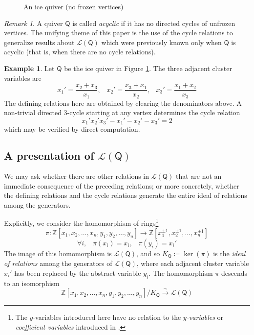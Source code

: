 \documentclass[10pt]{amsart}
\numberwithin{equation}{section}
\theoremstyle{definition}
\newtheorem{ex}[thm]{Example}
\theoremstyle{remark}
\newtheorem{rem}[thm]{Remark}
\renewcommand{\L}{\mathcal{L}}%
\newcommand{\1}{^{-1}}
\def\ZZ{\mathbb{Z}}
\newcommand{\garrow}[1]{\stackrel{#1}{\longrightarrow}}
\def\Q{\mathsf{Q}}
\begin{document}
\begin{figure}[h!t]
\caption{An ice quiver (no frozen vertices)}
\label{fig: 3cycle}
\end{figure}

\begin{rem}
A quiver $\Q$ is called \textit{acyclic} if it has no directed cycles of unfrozen vertices.  The unifying theme of this paper is the use of the cycle relations to generalize results about $\L(\Q)$ which were previously known only when $\Q$ is acyclic (that is, when there are no cycle relations).
\end{rem}

\begin{ex}
Let $\Q$ be the ice quiver in Figure \ref{fig: 3cycle}.  The three adjacent cluster variables are 
\[ x_1'= \frac{x_2+x_3}{x_1},\;\;\; x_2'=\frac{x_3+x_1}{x_2},\;\;\; x_3'=\frac{x_1+x_2}{x_3} \]
The defining relations here are obtained by clearing the denominators above.  A non-trivial directed $3$-cycle starting at any vertex determines the cycle relation
\[ x_1'x_2'x_3' - x_1'-x_2'-x_3'=2\]
which may be verified by direct computation.
\end{ex}

\subsection{A presentation of $\L(\Q)$}

We may ask whether there are other relations in $\L(\Q)$ that are not an immediate consequence of the preceding relations; or more concretely, whether the defining relations and the cycle relations generate the entire ideal of relations among the generators.

Explicitly, we consider the homomorphism of rings\footnote{The $y$-variables introduced here have no relation to the \emph{$y$-variables} or \emph{coefficient variables} introduced in \cite{FZ07}.}
\[ \pi :\ZZ[x_1,x_2,\dots,x_n,y_1,y_2,\dots,y_n]\longrightarrow \ZZ[x_1^{\pm1},x_2^{\pm1},\dots,x_n^{\pm1} ]\]
\[ \forall i, \;\;\; \pi(x_i) = x_i,\;\;\; \pi(y_i)=x_i'\]
The image of this homomorphism is $\L(\Q)$, and so $K_\Q \coloneqq \ker(\pi)$ is the \textit{ideal of relations} among the generators of $\L(\Q)$, where each adjacent cluster variable $x_i'$ has been replaced by the abstract variable $y_i$.  The homomorphism $\pi$ descends to an isomorphism
\[ \ZZ[x_1,x_2,\dots,x_n,y_1,y_2,\dots,y_n]/K_\Q\garrow{\sim} \L(\Q) \]
\end{document}
